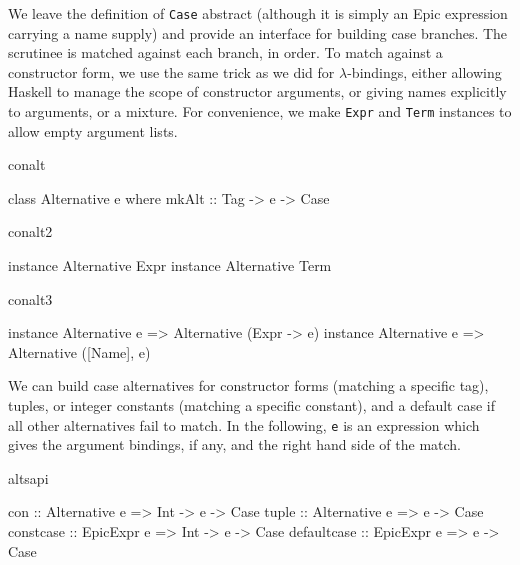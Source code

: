 \noindent
We leave the definition of \texttt{Case} abstract (although it is
simply an Epic expression carrying a name supply) and provide an
interface for building case branches.
The scrutinee is matched against each branch, in order. To match
against a constructor form, we use the same trick as we did for
$\lambda$-bindings, either allowing Haskell to manage the scope of
constructor arguments, or giving names explicitly to arguments, or a
mixture. For convenience, we make \texttt{Expr} and \texttt{Term} 
instances to allow empty argument lists.

\begin{SaveVerbatim}{conalt}

class Alternative e where
    mkAlt :: Tag -> e -> Case
\end{SaveVerbatim}
\begin{SaveVerbatim}{conalt2}

instance Alternative Expr
instance Alternative Term
\end{SaveVerbatim}
\begin{SaveVerbatim}{conalt3}

instance Alternative e => Alternative (Expr -> e)
instance Alternative e => Alternative ([Name], e)

\end{SaveVerbatim}



\noindent
We can build case alternatives for constructor forms (matching a
specific tag), tuples, or integer constants (matching a specific
constant), and a default case if all other alternatives fail to
match. In the following, \texttt{e} is an expression which
gives the argument bindings, if any, and the right hand side of the
match.


\begin{SaveVerbatim}{altsapi}

con         :: Alternative e => Int -> e -> Case
tuple       :: Alternative e =>        e -> Case
constcase   :: EpicExpr e    => Int -> e -> Case
defaultcase :: EpicExpr e    =>        e -> Case
\end{SaveVerbatim}

